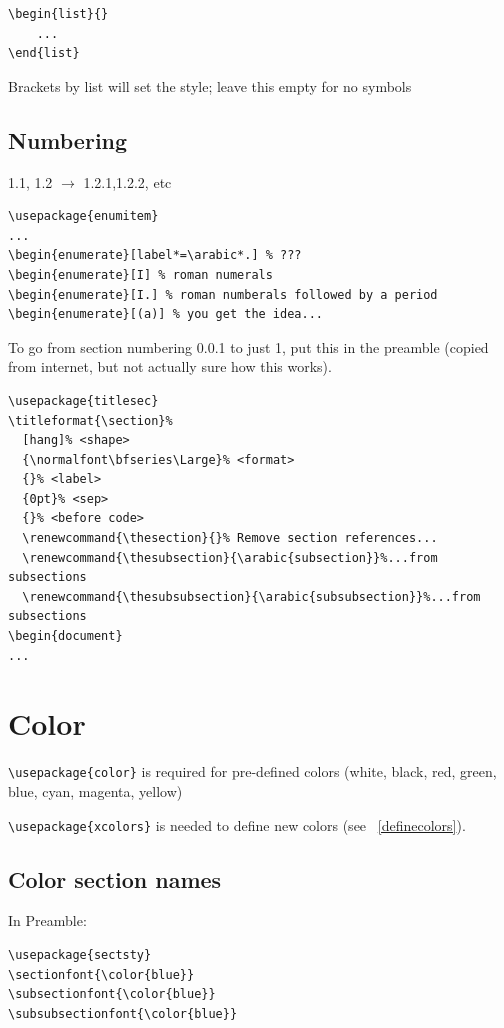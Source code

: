 \documentclass{article}
\begin{document}
\begin{verbatim}
\begin{list}{}
    ...
\end{list}
\end{verbatim}
Brackets by list will set the style; leave this empty for no symbols


\subsection{Numbering}
1.1, 1.2 $\rightarrow$ 1.2.1,1.2.2, etc
\begin{verbatim}
\usepackage{enumitem}
...
\begin{enumerate}[label*=\arabic*.] % ???
\begin{enumerate}[I] % roman numerals
\begin{enumerate}[I.] % roman numberals followed by a period
\begin{enumerate}[(a)] % you get the idea...
\end{verbatim}

To go from section numbering 0.0.1 to just 1,
put this in the preamble
(copied from internet, but not actually sure how this works).
\begin{verbatim}
\usepackage{titlesec}
\titleformat{\section}%
  [hang]% <shape>
  {\normalfont\bfseries\Large}% <format>
  {}% <label>
  {0pt}% <sep>
  {}% <before code>
  \renewcommand{\thesection}{}% Remove section references...
  \renewcommand{\thesubsection}{\arabic{subsection}}%...from subsections
  \renewcommand{\thesubsubsection}{\arabic{subsubsection}}%...from subsections
\begin{document}
...
\end{verbatim}

\section{Color}\label{color}

\verb|\usepackage{color}| is required for
pre-defined colors (white, black, red, green, blue, cyan, magenta, yellow)

\verb|\usepackage{xcolors}|
is needed to define new colors (see \SS{}~\ref{definecolors}).

\subsection{Color section names}
In Preamble:
\begin{verbatim}
\usepackage{sectsty}
\sectionfont{\color{blue}}
\subsectionfont{\color{blue}}
\subsubsectionfont{\color{blue}}
\end{verbatim}
\end{document}
